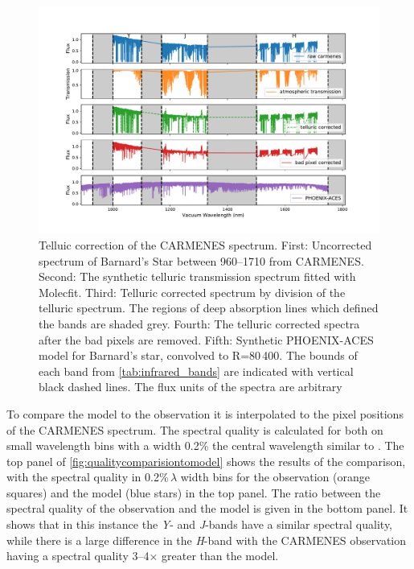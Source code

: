 \begin{figure}
    \centering
    \includegraphics[width=0.8\linewidth]{figures/information-content/Carmenes/bp_carmenes_masked_model_broadened}
    \caption[Telluic correction of the {CARMENES} \nir{} spectrum.]{Telluic correction of the {CARMENES} \nir{} spectrum.
        First: Uncorrected spectrum of Barnard's Star between 960--1710\nm{} from {CARMENES}.
        Second: The synthetic telluric transmission spectrum fitted with {Molecfit}.
        Third: Telluric corrected spectrum by division of the telluric spectrum.
        The regions of deep  absorption lines which defined the \nir{} bands are shaded grey.
        Fourth: The telluric corrected spectra after the bad pixels are removed.
        Fifth: Synthetic PHOENIX-ACES model for Barnard's star, convolved to R=80\,400.
        The bounds of each band from \cref{tab:infrared_bands} are indicated with vertical black dashed lines.
        The flux units of the spectra are arbitrary}
    \label{fig:carmenes_correction}
\end{figure}


To compare the model to the observation it is interpolated to the pixel positions of the {CARMENES} spectrum.
The spectral quality is calculated for both on small wavelength bins with a width 0.2\% the central wavelength similar to \citep{artigau_optical_2018}.
The top panel of \cref{fig:qualitycomparisiontomodel} shows the results of the comparison, with the spectral quality in 0.2\%\,\(\lambda\) width bins for the observation (orange squares) and the model (blue stars) in the top panel.
The ratio between the spectral quality of the observation and the model is given in the bottom panel.
It shows that in this instance the \emph{Y}- and \emph{J}-bands have a similar spectral quality, while there is a large difference in the \emph{H}-band with the CARMENES observation having a spectral quality 3--4\(\times\) greater than the model.

